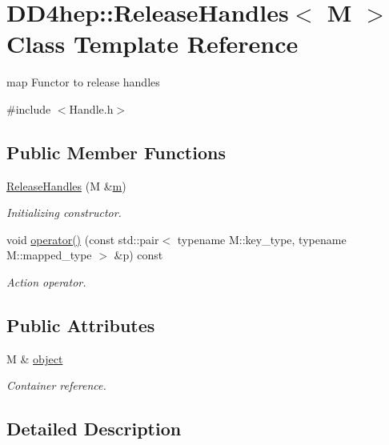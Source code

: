 \hypertarget{class_d_d4hep_1_1_release_handles}{}\section{D\+D4hep\+:\+:Release\+Handles$<$ M $>$ Class Template Reference}
\label{class_d_d4hep_1_1_release_handles}


map Functor to release handles  




{\ttfamily \#include $<$Handle.\+h$>$}

\subsection*{Public Member Functions}
\begin{DoxyCompactItemize}
\item 
\hyperlink{class_d_d4hep_1_1_release_handles_ab9f432d35b2e93e934d5346e9d7a3608}{Release\+Handles} (M \&\hyperlink{_volumes_8cpp_a6fc379aaec47ce424b00d8ffda2a6c59}{m})
\begin{DoxyCompactList}\small\item\em Initializing constructor. \end{DoxyCompactList}\item 
void \hyperlink{class_d_d4hep_1_1_release_handles_acae11ef8267e0a463b041c9134f1cef3}{operator()} (const std\+::pair$<$ typename M\+::key\+\_\+type, typename M\+::mapped\+\_\+type $>$ \&p) const
\begin{DoxyCompactList}\small\item\em Action operator. \end{DoxyCompactList}\end{DoxyCompactItemize}
\subsection*{Public Attributes}
\begin{DoxyCompactItemize}
\item 
M \& \hyperlink{class_d_d4hep_1_1_release_handles_a859c2b05fd3a51dbbeee2b6937a19068}{object}
\begin{DoxyCompactList}\small\item\em Container reference. \end{DoxyCompactList}\end{DoxyCompactItemize}


\subsection{Detailed Description}

